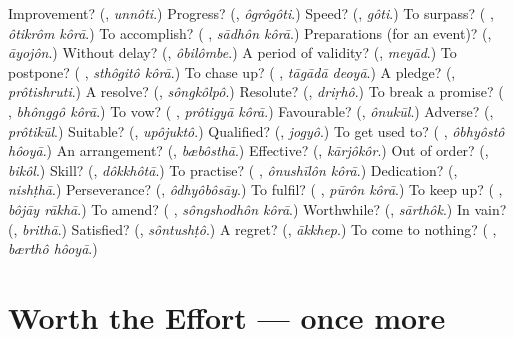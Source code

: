 \begin{tcolorbox}[breakable,colback=teal!4,colframe=teal!35!black,title={Before you move on}]
Improvement? (\textbf{}, \emph{unnôti}.) Progress? (\textbf{}, \emph{ôgrôgôti}.) Speed? (\textbf{}, \emph{gôti}.) To surpass? (\textbf{ }, \emph{ôtikrôm kôrā}.) To accomplish? (\textbf{ }, \emph{sādhôn kôrā}.) Preparations (for an event)? (\textbf{}, \emph{āyojôn}.) Without delay? (\textbf{}, \emph{ôbilômbe}.) A period of validity? (\textbf{}, \emph{meyād}.) To postpone? (\textbf{ }, \emph{sthôgitô kôrā}.) To chase up? (\textbf{ }, \emph{tāgādā deoyā}.) A pledge? (\textbf{}, \emph{prôtishruti}.) A resolve? (\textbf{}, \emph{sôngkôlpô}.) Resolute? (\textbf{}, \emph{driṛhô}.) To break a promise? (\textbf{ }, \emph{bhônggô kôrā}.) To vow? (\textbf{ }, \emph{prôtigyā kôrā}.) Favourable? (\textbf{}, \emph{ônukūl}.) Adverse? (\textbf{}, \emph{prôtikūl}.) Suitable? (\textbf{}, \emph{upôjuktô}.) Qualified? (\textbf{}, \emph{jogyô}.) To get used to? (\textbf{ }, \emph{ôbhyôstô hôoyā}.) An arrangement? (\textbf{}, \emph{bæbôsthā}.) Effective? (\textbf{}, \emph{kārjôkôr}.) Out of order? (\textbf{}, \emph{bikôl}.) Skill? (\textbf{}, \emph{dôkkhôtā}.) To practise? (\textbf{ }, \emph{ônushīlôn kôrā}.) Dedication? (\textbf{}, \emph{nishṭhā}.) Perseverance? (\textbf{}, \emph{ôdhyôbôsāy}.) To fulfil? (\textbf{ }, \emph{pūrôn kôrā}.) To keep up? (\textbf{ }, \emph{bôjāy rākhā}.) To amend? (\textbf{ }, \emph{sôngshodhôn kôrā}.) Worthwhile? (\textbf{}, \emph{sārthôk}.) In vain? (\textbf{}, \emph{brithā}.) Satisfied? (\textbf{}, \emph{sôntushṭô}.) A regret? (\textbf{}, \emph{ākkhep}.) To come to nothing? (\textbf{ }, \emph{bærthô hôoyā}.)
\end{tcolorbox}
\section[(dialogue)]{Worth the Effort — once more}

\label{lesson:BN-R383-review-final-383}



